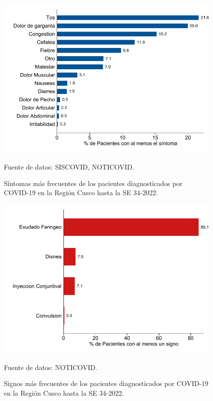 \documentclass[12pt,a4paper,openany]{book}
\begin{document}
	 
	
	\begin{figure}[h]
		\caption{Síntomas más frecuentes de los pacientes diagnosticados por COVID-19 en la Región Cusco hasta la SE 34-2022.  }\label{fig:sintomas}
		\begin{center}
			\includegraphics[width=0.85\linewidth]{../figuras/figura_sintoma.pdf}
		\end{center}
		{\footnotesize {Fuente de datos: SISCOVID, NOTICOVID.}}
	\end{figure}
	
	\begin{figure}[h]
		\caption{Signos más frecuentes de los pacientes diagnosticados por COVID-19 en la Región Cusco hasta la SE 34-2022.}\label{fig:signos}
		\begin{center}
			\includegraphics[width=0.65\linewidth]{../figuras/figura_signo.pdf}
		\end{center}
		{\footnotesize {Fuente de datos: NOTICOVID.}}
	\end{figure}
	
	
	  
\end{document}
